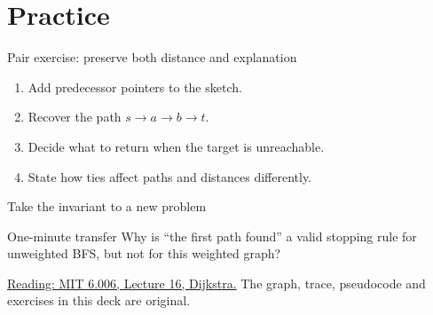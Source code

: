 \documentclass[11pt,aspectratio=43]{beamer}
\begin{document}
\section{Practice}
\begin{frame}{Pair exercise: preserve both distance and explanation}
\begin{enumerate}
\item Add predecessor pointers to the sketch.
\item Recover the path $s\to a\to b\to t$.
\item Decide what to return when the target is unreachable.
\item State how ties affect paths and distances differently.
\end{enumerate}
\end{frame}
\begin{frame}{Take the invariant to a new problem}
\begin{block}{One-minute transfer}
Why is ``the first path found'' a valid stopping rule for unweighted BFS, but not for this weighted graph?
\end{block}
\small
\href{https://ocw.mit.edu/courses/6-006-introduction-to-algorithms-fall-2011/resources/mit6_006f11_lec16/}{Reading: MIT 6.006, Lecture 16, Dijkstra.}
\medskip
The graph, trace, pseudocode and exercises in this deck are original.
\end{frame}
\end{document}
